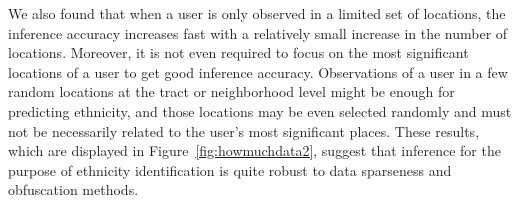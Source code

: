 % 

We also found that when a user is only observed in a limited set of locations, the inference accuracy increases fast with a relatively small increase in the number of locations. Moreover, it is not even required to focus on the most significant locations of a user to get good inference accuracy. Observations of a user in a few random locations at the tract or neighborhood level might be enough for predicting ethnicity, and those locations may be even selected randomly and must not be necessarily related to the user's most significant places. These results, which are displayed in Figure~\ref{fig:howmuchdata2}, suggest that inference for the purpose of ethnicity identification is quite robust to data sparseness and obfuscation methods.


